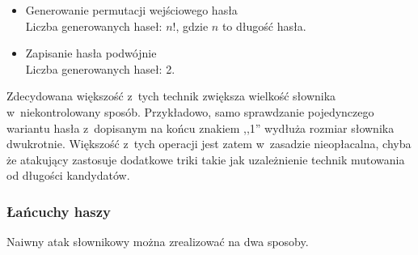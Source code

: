 \begin{itemize}
        

        

    \item
        Generowanie permutacji wejściowego hasła \\
        Liczba generowanych haseł: $n!$, gdzie $n$ to długość hasła.

        

        

    \item
        Zapisanie hasła podwójnie \\
        Liczba generowanych haseł: 2.

        

        

\end{itemize}

Zdecydowana większość z~tych technik zwiększa wielkość słownika
w~niekontrolowany sposób. Przykładowo, samo sprawdzanie pojedynczego wariantu
hasła z~dopisanym na końcu znakiem ,,1'' wydłuża rozmiar słownika dwukrotnie.
Większość z~tych operacji jest zatem w~zasadzie nieopłacalna, chyba że
atakujący zastosuje dodatkowe triki takie jak uzależnienie technik mutowania od
długości kandydatów.



\subsubsection{Łańcuchy haszy}
Naiwny atak słownikowy można zrealizować na dwa sposoby.

